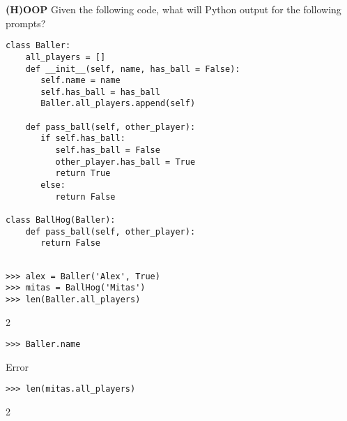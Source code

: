 \begin{blocksection}
\question \textbf{(H)OOP} \newline
Given the following code, what will Python output for the following prompts? 

\begin{lstlisting}
class Baller:
    all_players = []
    def __init__(self, name, has_ball = False):
       self.name = name
       self.has_ball = has_ball
       Baller.all_players.append(self)
    
    def pass_ball(self, other_player):
       if self.has_ball:
          self.has_ball = False
          other_player.has_ball = True
          return True
       else:
          return False

class BallHog(Baller):
    def pass_ball(self, other_player):  
       return False 
       
\end{lstlisting}
\end{blocksection}
\newline
\newline
\newline
\begin{blocksection}

\begin{lstlisting}
>>> alex = Baller('Alex', True)
>>> mitas = BallHog('Mitas')
>>> len(Baller.all_players)
\end{lstlisting}
\begin{solution}[.2in]
2
\end{solution}

\begin{lstlisting}
>>> Baller.name
\end{lstlisting}
\begin{solution}[.2in]
Error
\end{solution}

\begin{lstlisting}
>>> len(mitas.all_players)
\end{lstlisting}
\begin{solution}[.2in]
2
\end{solution}
\end{blocksection}

